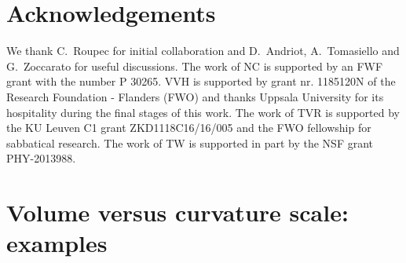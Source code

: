 \documentclass[11pt]{article}
\renewcommand{\[}{\left[}
\renewcommand{\]}{\right]}
\renewcommand{\(}{\left(}
\renewcommand{\)}{\right)}
\newcommand{\<}{\langle}
\renewcommand{\>}{\rangle}
\begin{document}
\section*{Acknowledgements}
We thank C.~Roupec for initial collaboration and D.~Andriot, A.~Tomasiello and G.~Zoccarato for useful discussions. 
The work of NC is supported by an FWF grant with the number P 30265. VVH is supported by grant nr. 1185120N of the Research Foundation - Flanders (FWO) and thanks Uppsala University for its hospitality during the final stages of this work.
The work of TVR is supported by the KU Leuven C1 grant ZKD1118C16/16/005 and the FWO fellowship for sabbatical research.
The work of TW is supported in part by the NSF grant PHY-2013988. 


\appendix
\section{Volume versus curvature scale: examples}\label{examples}
\end{document}
